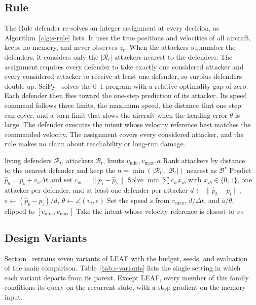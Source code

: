 \subsection{Rule}
The Rule defender re-solves an integer assignment at every decision, as Algorithm~\ref{alg:s-rule} lists. It uses the true positions and velocities of all aircraft, keeps no memory, and never observes $z_t$. When the attackers outnumber the defenders, it considers only the $|\mathcal R_t|$ attackers nearest to the defenders. The assignment requires every defender to take exactly one considered attacker and every considered attacker to receive at least one defender, so surplus defenders double up. SciPy~\cite{virtanen2020scipy} solves the 0--1 program with a relative optimality gap of zero. Each defender then flies toward the one-step prediction of its attacker. Its speed command follows three limits, the maximum speed, the distance that one step can cover, and a turn limit that slows the aircraft when the heading error $\theta$ is large. The defender executes the intent whose velocity reference best matches the commanded velocity. The assignment covers every considered attacker, and the rule makes no claim about reachability or long-run damage.

\begin{algorithm}[!t]
\caption{Rule Defender at Decision $t$}
\label{alg:s-rule}
\begin{algorithmic}[1]
\REQUIRE living defenders $\mathcal R_t$, attackers $\mathcal B_t$, limits $v_{\min},v_{\max},\bar a$
\STATE Rank attackers by distance to the nearest defender and keep the $n=\min(|\mathcal R_t|,|\mathcal B_t|)$ nearest as $\mathcal B^\star$
\STATE Predict $\hat p_b=p_b+v_b\Delta t$ and set $c_{ib}=\|p_i-\hat p_b\|$
\STATE Solve $\min\sum c_{ib}x_{ib}$ with $x_{ib}\in\{0,1\}$, one attacker per defender, and at least one defender per attacker
\STATE $d\gets\|\hat p_b-p_i\|$, $e\gets(\hat p_b-p_i)/d$, $\theta\gets\angle(v_i,e)$
\STATE Set the speed $s$ from $v_{\max}$, $d/\Delta t$, and $\bar a/\theta$, clipped to $[v_{\min},v_{\max}]$
\STATE Take the intent whose velocity reference is closest to $s\,e$
\ENDFOR
\end{algorithmic}
\end{algorithm}

\subsection{Design Variants}
Section~ retrains seven variants of LEAF with the budget, seeds, and evaluation of the main comparison. Table~\ref{tab:s-variants} lists the single setting in which each variant departs from its parent. Except LEAF, every member of this family conditions its query on the recurrent state, with a stop-gradient on the memory input.

